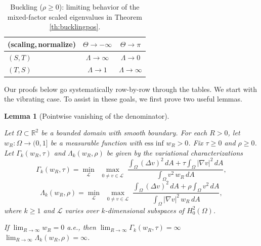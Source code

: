 \documentclass[11pt]{amsart}
\newtheorem{lemma}[theorem]{Lemma}
\theoremstyle{definition}
\numberwithin{equation}{section}
\newcommand{\R}{\mathbb{R}}
\begin{document}
\begin{table}[ht]
  \centering
  \begin{tabular}{@{}lcc@{}}
    \toprule
    (scaling,\,normalize) & $\Theta\to-\infty$ & $\Theta\to\pi$ \\
    \midrule
    $(S,T)$ & $\Lambda \to \infty$ & $\Lambda \to 0$ \\
    $(T,S)$ & $\Lambda \to 1$ & $\Lambda \to \infty$ \\
    \bottomrule
  \end{tabular}
  \caption{Buckling ($\rho\ge 0$): limiting behavior of the mixed-factor scaled eigenvalues in Theorem \ref{th:bucklingpos}.}
  \label{tab:buckling-pos-mixed-limits-conj}
\end{table}

Our proofs below go systematically row-by-row through the tables. We start with the vibrating case. To assist in these goals, we first prove two useful lemmas.

\begin{lemma}[Pointwise vanishing of the denominator]\label{lem:ptwisevanfourthorder}

Let $\Omega \subset \R^2$ be a bounded domain with smooth boundary. For each $R > 0$, let $w_R:\Omega \to (0,1]$ be a measurable function with $\text{ess inf } w_R > 0$. Fix $\tau \geq 0$ and $\rho \geq 0$. Let $\Gamma_k(w_R,\tau)$ and $\Lambda_k(w_R,\rho)$ be given by the variational characterizations
$$
\Gamma_k(w_R,\tau)
=
\min_{\mathcal L}\ \max_{\substack{0\neq v\in \mathcal L}}
\frac{\displaystyle \int_\Omega (\Delta v)^2\,dA + \tau \int_\Omega |\nabla v|^2\,dA}
{\displaystyle \int_\Omega v^2\,w_R\,dA},
$$
$$
\Lambda_k(w_R,\rho)
=
\min_{\mathcal L}\ \max_{\substack{0\neq v\in \mathcal L}}
\frac{\displaystyle \int_\Omega (\Delta v)^2\,dA + \rho \int_\Omega v^2\,dA}
{\displaystyle \int_\Omega |\nabla v|^2\,w_R\,dA},
$$
where $k \geq 1$ and $\mathcal L$ varies over $k$-dimensional subspaces of $H_0^2(\Omega)$. 

If $\lim_{R\to\infty} w_R = 0$ a.e., then $\lim_{R\to\infty} \Gamma_k(w_R,\tau)=\infty$ $\lim_{R\to\infty} \Lambda_k(w_R,\rho)=\infty$.
\end{lemma}
\end{document}
